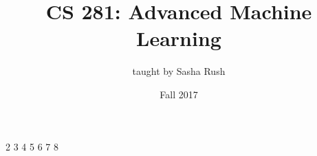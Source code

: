 \documentclass{article}
\begin{document}
\title{CS 281: Advanced Machine Learning}
\date{Fall 2017}
\author{taught by Sasha Rush}
\maketitle

\tableofcontents
\eject

{2}
{3}
{4}
{5}
{6}
{7}
{8}
\end{document}
